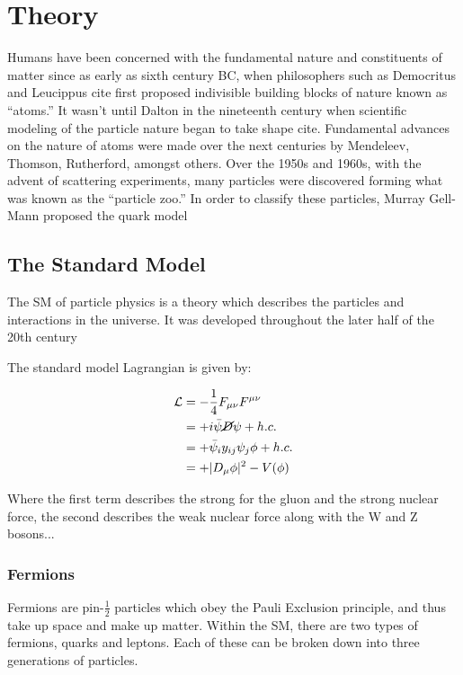 \chapter{Theory}

    Humans have been concerned with the fundamental nature and constituents of matter since as early as sixth century BC, when philosophers such as Democritus and Leucippus {\color{red} cite} first proposed indivisible building blocks of nature known as ``atoms.'' It wasn't until Dalton in the nineteenth century when scientific modeling of the particle nature began to take shape {\color{red} cite}. Fundamental advances on the nature of atoms were made over the next centuries by Mendeleev, Thomson, Rutherford, amongst others. Over the 1950s and 1960s, with the advent of scattering experiments, many particles were discovered forming what was known as the ``particle zoo.'' In order to classify these particles, Murray Gell-Mann proposed the quark model
    

    \section{The Standard Model}

        The \gls{SM} of particle physics is a theory which describes the particles and interactions in the universe. It was developed throughout the later half of the 20th century
        
        The standard model Lagrangian is given by:

        \begin{equation}
            \begin{aligned}
                \mathcal{L} &= - \frac{1}{4} F_{\mu \nu} F^{\mu \nu} \\
                &=+ i \bar{\psi} \cancel{D} \psi + h.c. \\
                &=+ \bar{\psi}_i y_{ij} \psi_j \phi + h.c. \\
                &=+ |D_\mu \phi|^2 - V(\phi)
            \end{aligned}
        \end{equation}

        Where the first term describes the strong for the gluon and the strong nuclear force, the second describes the weak nuclear force along with the W and Z bosons... 

        \subsection{Fermions}
        Fermions are pin-$\frac{1}{2}$ particles which obey the Pauli Exclusion principle, and thus take up space and make up matter. Within the \gls{SM}, there are two types of fermions, quarks and leptons. Each of these can be broken down into three generations of particles.

